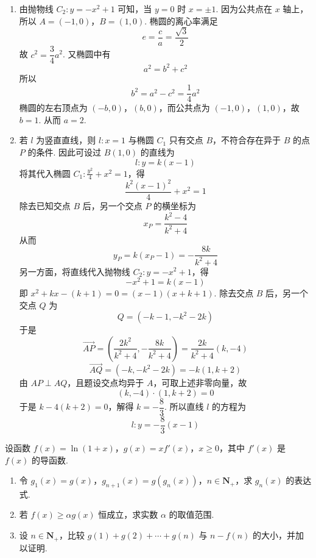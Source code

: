 \begin{solution}
\begin{enumerate}
\item 由抛物线 \(C_2:y=-x^2+1\) 可知，当 \(y=0\) 时 \(x=\pm1\). 因为公共点在 \(x\) 轴上，所以
\(A=(-1,0)\)，\(B=(1,0)\).
椭圆的离心率满足
\[
e=\frac ca=\frac{\sqrt3}{2}
\]
故 \(c^2=\dfrac34a^2\). 又椭圆中有
\[
a^2=b^2+c^2
\]
所以
\[
b^2=a^2-c^2=\frac14a^2
\]
椭圆的左右顶点为 \((-b,0)\)，\((b,0)\)，而公共点为 \((-1,0)\)，\((1,0)\)，故 \(b=1\). 从而 \(a=2\).

\item 若 \(l\) 为竖直直线，则 \(l:x=1\) 与椭圆 \(C_1\) 只有交点 \(B\)，不符合存在异于 \(B\) 的点 \(P\) 的条件. 因此可设过 \(B(1,0)\) 的直线为
\[
l:y=k(x-1)
\]
将其代入椭圆 \(C_1:\frac{y^2}{4}+x^2=1\)，得
\[
\frac{k^2(x-1)^2}{4}+x^2=1
\]
除去已知交点 \(B\) 后，另一个交点 \(P\) 的横坐标为
\[
x_P=\frac{k^2-4}{k^2+4}
\]
从而
\[
y_P=k(x_P-1)=-\frac{8k}{k^2+4}
\]
另一方面，将直线代入抛物线 \(C_2:y=-x^2+1\)，得
\[
-x^2+1=k(x-1)
\]
即 \(x^2+kx-(k+1)=0=(x-1)(x+k+1)\). 除去交点 \(B\) 后，另一个交点 \(Q\) 为
\[
Q=(-k-1,-k^2-2k)
\]
于是
\[
\overrightarrow{AP}=\left(\frac{2k^2}{k^2+4},-\frac{8k}{k^2+4}\right)
=\frac{2k}{k^2+4}(k,-4)
\]
\[
\overrightarrow{AQ}=(-k,-k^2-2k)=-k(1,k+2)
\]
由 \(AP\perp AQ\)，且题设交点均异于 \(A\)，可取上述非零向量，故
\[
(k,-4)\cdot(1,k+2)=0
\]
于是
\(k-4(k+2)=0\)，解得 \(k=-\dfrac83\).
所以直线 \(l\) 的方程为
\[
l:y=-\frac83(x-1)
\]
\end{enumerate}
\end{solution}

\begin{problem}
设函数 \(f(x) = \ln (1 + x)\)，\(g(x) = xf'(x)\)，\(x \geqslant 0\)，其中 \(f'(x)\) 是 \(f(x)\) 的导函数.
\begin{enumerate}
\item 令 \(g_{1}(x) = g(x)\)，\(g_{n + 1}(x) = g(g_{n}(x))\)，\(n \in \mathbf{N}_{+}\)，求 \(g_{n}(x)\) 的表达式.
\item 若 \(f(x) \geqslant \alpha g(x)\) 恒成立，求实数 \(\alpha\) 的取值范围.
\item 设 \(n \in \mathbf{N}_{+}\)，比较 \(g(1) + g(2) + \cdots + g(n)\) 与 \(n - f(n)\) 的大小，并加以证明.
\end{enumerate}
\end{problem}

